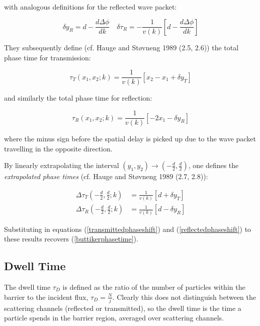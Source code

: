 \documentclass{article}
\begin{document}
\noindent with analogous definitions for the reflected wave packet:

\begin{equation}
	\delta y_R = d-\frac{d\Delta\phi}{dk} \quad \delta\tau_R=-\frac{1}{v(k)} \left[d-\frac{d\Delta\phi}{dk}\right]
	\label{reflectedphaseshift}
\end{equation}

\noindent They subsequently define (cf. Hauge and St{\o}vneng 1989 (2.5, 2.6)) the total phase time for transmission:

\begin{equation}
	\tau_T(x_1,x_2;k) = \frac{1}{v(k)}[x_2-x_1+\delta y_T]
\end{equation}

\noindent and similarly the total phase time for reflection:

\begin{equation}
	\tau_R(x_1,x_2;k) = \frac{1}{v(k)}[-2x_1-\delta y_R]
\end{equation}

\noindent where the minus sign before the spatial delay is picked up due to the wave packet travelling in the opposite direction.

\noindent By linearly extrapolating the interval $(y_1,y_2) \rightarrow (-\frac{d}{2},\frac{d}{2})$, one defines the \textit{extrapolated phase times} (cf. Hauge and St{\o}vneng 1989 (2.7, 2.8)):

\begin{align}
	\Delta\tau_T(-\frac{d}{2},\frac{d}{2};k) &= \frac{1}{v(k)}[d+\delta y_T] \\
	\Delta\tau_R(-\frac{d}{2},\frac{d}{2};k) &= \frac{1}{v(k)}[d-\delta y_R]
\end{align}

\noindent Substituting in equations (\ref{transmittedphaseshift}) and (\ref{reflectedphaseshift}) to these results recovers (\ref{buttikerphasetime}).

\subsection{Dwell Time}
\label{subsection:dwelltime}

The dwell time $\tau_D$ is defined as the ratio of the number of particles within the barrier to the incident flux, $\tau_D = \frac{N}{j}$. Clearly this does not distinguish between the scattering channels (reflected or transmitted), so the dwell time is the time a particle spends in the barrier region, averaged over scattering channels.
\end{document}
